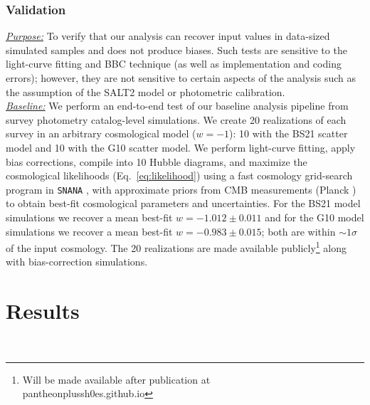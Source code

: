 \documentclass[twocolumn]{aastex63}
\begin{document}
\subsubsection{\textbf{Validation}}
\label{subsubsection:validation}

\noindent\uline{\textit{Purpose:}} To verify that our analysis can recover input values in data-sized simulated samples and does not produce biases. {Such tests are sensitive to the light-curve fitting and BBC technique (as well as implementation and coding errors); however, they are not sensitive to certain aspects of the analysis such as the assumption of the SALT2 model or photometric calibration.}\\
\uline{\textit{Baseline:}} We perform an end-to-end test of our baseline analysis pipeline from survey photometry catalog-level simulations. We create 20 realizations of each survey in an arbitrary cosmological model ($w=-1$): 10 with the BS21 scatter model and 10 with the G10 scatter model. We perform light-curve fitting, apply bias corrections, compile into 10 Hubble diagrams, and maximize the cosmological likelihoods (Eq.~\ref{eq:likelihood}) using a fast cosmology grid-search program in \texttt{SNANA} \citep{Kessler2009}, with approximate priors from
CMB measurements (Planck \citealt{planck})
to obtain best-fit cosmological parameters and uncertainties. For the BS21 model simulations we recover a mean best-fit $w=-1.012 \pm 0.011$ and for the G10 model simulations we recover a mean best-fit $w=-0.983\pm0.015$; both are within $\sim1\sigma$ of the input cosmology. The 20 realizations are made available publicly\footnote{Will be made available after publication at\\ pantheonplussh0es.github.io} along with bias-correction simulations.\\





\vspace{5mm}




\section{Results}
~\label{sec:Results}
\end{document}
